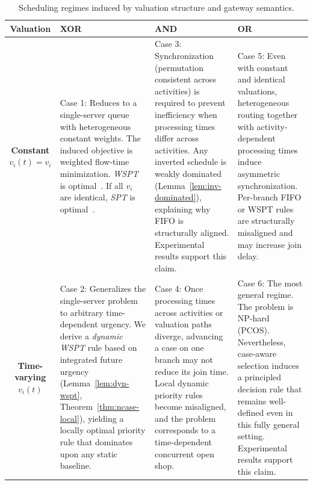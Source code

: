 \documentclass[letterpaper]{article}
\begin{document}
\begin{table}[t!]
\centering
\small
\setlength{\tabcolsep}{1pt}  
\begin{tabular}{|c|p{4.9cm}|p{4.9cm}|p{4.9cm}|}
\hline
\textbf{Valuation} 
& \textbf{XOR} 
& \textbf{AND} 
& \textbf{OR} \\
\hline
\textbf{Constant $v_i(t)=v_i$}
&
Case 1: Reduces to a single-server queue with heterogeneous constant weights.
The induced objective is weighted flow-time minimization.
\emph{WSPT} is optimal~\citep{smith1956various}.
If all $v_i$ are identical, \emph{SPT} is optimal~\citep{schrage1968sequencing}.
&
Case 3: Synchronization (permutation consistent across activities) is required to prevent inefficiency when processing times differ across activities.
Any inverted schedule is weakly dominated (Lemma~\ref{lem:inv-dominated}), explaining why FIFO is structurally aligned.
Experimental results support this claim.
&
Case 5: 
Even with constant and identical valuations, heterogeneous routing together with activity-dependent processing times induce asymmetric synchronization.
Per-branch FIFO or WSPT rules are structurally misaligned and may increase join delay.

\\
\hline
\textbf{Time-varying $v_i(t)$}
&
Case 2: Generalizes the single-server problem to arbitrary time-dependent urgency.
We derive a \emph{dynamic WSPT} rule based on integrated future urgency
(Lemma~\ref{lem:dyn-wspt}, Theorem~\ref{thm:ncase-local}), yielding a locally optimal priority rule
that dominates upon any static baseline.
&
Case 4: Once processing times across activities or valuation paths diverge, advancing a case on one branch may not reduce its join time.
Local dynamic priority rules become misaligned, and the problem corresponds to a time-dependent concurrent open shop.
&
Case 6: The most general regime.
The problem is NP-hard (PCOS). Nevertheless, case-aware selection induces a principled decision rule that remains well-defined even in this fully general setting.
Experimental results support this claim.
\\
\hline
\end{tabular}
\caption{Scheduling regimes induced by valuation structure and gateway semantics.}
\label{tab:taxonomy}
\end{table}



\end{document}
